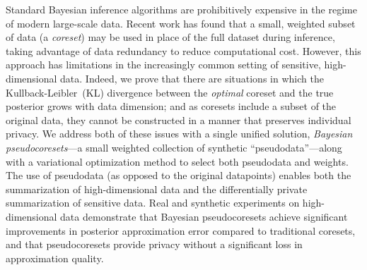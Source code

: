 {
Standard Bayesian inference algorithms are prohibitively expensive in the
regime of modern large-scale data. Recent work has found that
a small, weighted subset of data (a \emph{coreset}) may be used in place
of the full dataset during inference, taking advantage of data redundancy to
reduce computational cost. However, this approach has limitations 
in the increasingly common setting of sensitive, high-dimensional data. 
Indeed, we prove that there are situations in which 
the Kullback-Leibler~(KL) divergence between the \emph{optimal} coreset 
and the true posterior grows with data dimension; and as coresets include
a subset of the original data, they cannot be constructed in a manner
that preserves individual privacy.
We address both of these issues with a single unified solution, \emph{Bayesian
pseudocoresets}---a small weighted collection of synthetic
``pseudodata''---along with a variational optimization method to select both
pseudodata and weights.  The use of pseudodata (as opposed to
the original datapoints) enables both the summarization of high-dimensional data
and the  differentially private summarization of
sensitive data. Real and
synthetic experiments on high-dimensional data demonstrate that Bayesian 
pseudocoresets achieve significant improvements in posterior approximation error compared to
traditional coresets, and that pseudocoresets provide privacy without
a significant loss in approximation quality. 
}

